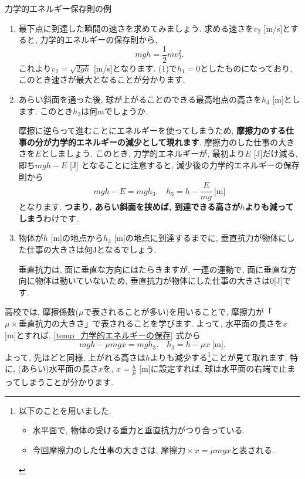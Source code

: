\documentclass[11pt,dvipdfmx]{jsarticle}
\numberwithin{equation}{section} %
\begin{document}
\begin{exbox}{力学的エネルギー保存則の例}
\begin{enumerate}
\begin{equation}
            mgh = \frac{1}{2}mv_{1}^2 + mgh_{1}.
        \end{equation}
        これより, $v_{1} = \sqrt{2g(h - h_{1})}$ [m/s]を得ます. つまり, $h_{1}$が小さい$\Longleftrightarrow$ 位置が低くなるほど, 球の速さが大きくなることが式からも分かります. 
        \item 最下点に到達した瞬間の速さを求めてみましょう. 求める速さを$v_{2}$ [m/s]とすると, 力学的エネルギーの保存則から, 
        \begin{equation}
            mgh = \frac{1}{2}mv_{2}^2.
        \end{equation}
        これより$v_{2} = \sqrt{2gh}$ [m/s]となります. (1)で$h_{1} = 0$としたものになっており, このとき速さが最大となることが分かります. 
        \item あらい斜面を通った後, 球が上がることのできる最高地点の高さを$h_{3}$ [m]とします. このとき$h_{3}$は何mでしょうか. 
        
        摩擦に逆らって進むことにエネルギーを使ってしまうため, \textbf{摩擦力のする仕事の分が力学的エネルギーの減少として現れます}. 摩擦力のした仕事の大きさを$E$としましょう. このとき, 力学的エネルギーが, 最初より$E$ [J]だけ減る, 即ち$mgh-E$ [J] となることに注意すると, 減少後の力学的エネルギーの保存則から
        \begin{equation}
            mgh-E = mgh_{3}.\quad h_{3}= h - \frac{E}{mg} \ \text{[m]} \label{temp_力学的エネルギーの保存}
        \end{equation}
        となります. \textbf{つまり, あらい斜面を挟めば, 到達できる高さが$h$よりも減ってしまう}わけです. 
        \item 物体が$h$ [m]の地点から$h_{3}$ [m]の地点に到達するまでに, 垂直抗力が物体にした仕事の大きさは何Jとなるでしょう. 
        
        垂直抗力は, 面に垂直な方向にはたらきますが, 一連の運動で, 面に垂直な方向に物体は動いていないため, 垂直抗力が物体にした仕事の大きさは0[J]です.
    \end{enumerate}
\end{exbox}
高校では, 摩擦係数($\mu$で表されることが多い)を用いることで, 摩擦力が「
$\mu \times 垂直抗力の大きさ$」で表されることを学びます. よって, 水平面の長さを$x$ [m]とすれば, \eqref{temp_力学的エネルギーの保存} 式から
\begin{equation}
    mgh-\mu mgx = mgh_{3}.\quad h_{3}= h - \mu x \ \text{[m]}. 
\end{equation}
よって, 先ほどと同様, 上がれる高さは$h$よりも減少する\footnote{以下のことを用いました. 
\begin{itemize}
    \item 水平面で, 物体の受ける重力と垂直抗力がつり合っている. 
    \item 今回摩擦力のした仕事の大きさは, $摩擦力 \times x = \mu mgx$と表される. 
\end{itemize}
}ことが見て取れます. 特に, (あらい)水平面の長さ$x$を, $x = \frac{h}{\mu}$ [m]に設定すれば, 球は水平面の右端で止まってしまうことが分かります.
\end{document}
